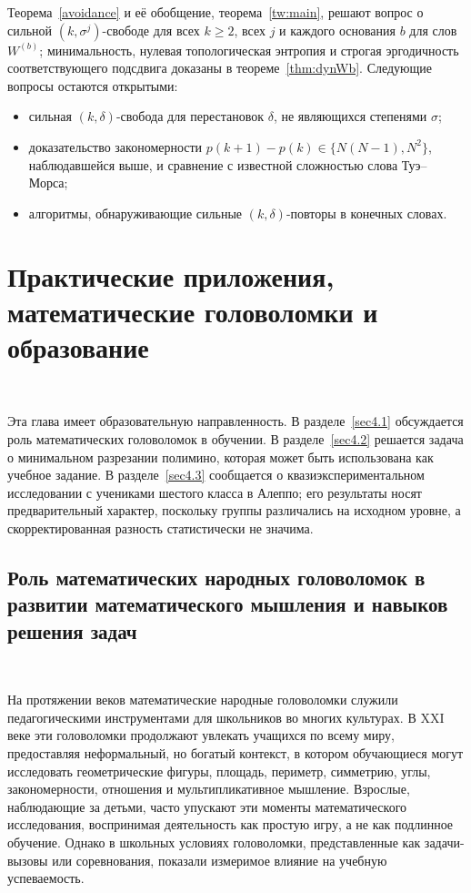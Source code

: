 \documentclass[a4paper,14pt]{extreport}
\theoremstyle{plain}
\theoremstyle{definition}
\theoremstyle{remark}
\begin{document}
Теорема~\ref{avoidance} и её обобщение, теорема~\ref{tw:main}, решают вопрос о сильной $(k,\sigma^j)$-свободе для всех $k\ge2$, всех $j$ и каждого основания $b$ для слов $W^{(b)}$; минимальность, нулевая топологическая энтропия и строгая эргодичность соответствующего подсдвига доказаны в теореме~\ref{thm:dynWb}. Следующие вопросы остаются открытыми:
\begin{itemize}
	\item сильная $(k,\delta)$-свобода для перестановок $\delta$, не являющихся степенями $\sigma$;
	\item доказательство закономерности $p(k+1)-p(k)\in\{N(N-1),N^2\}$, наблюдавшейся выше, и сравнение с известной сложностью слова Туэ--Морса;
	\item алгоритмы, обнаруживающие сильные $(k,\delta)$-повторы в конечных словах.
\end{itemize}
\chapter{Практические приложения, математические головоломки и образование}~\label{sec4}

Эта глава имеет образовательную направленность. В разделе~\ref{sec4.1} обсуждается роль математических головоломок в обучении. В разделе~\ref{sec4.2} решается задача о минимальном разрезании полимино, которая может быть использована как учебное задание. В разделе~\ref{sec4.3} сообщается о квазиэкспериментальном исследовании с учениками шестого класса в Алеппо; его результаты носят предварительный характер, поскольку группы различались на исходном уровне, а скорректированная разность статистически не значима.
\section{Роль математических народных головоломок в развитии математического мышления и навыков решения задач}~\label{sec4.1}

На протяжении веков математические народные головоломки служили педагогическими инструментами для школьников во многих культурах. В XXI веке эти головоломки продолжают увлекать учащихся по всему миру, предоставляя неформальный, но богатый контекст, в котором обучающиеся могут исследовать геометрические фигуры, площадь, периметр, симметрию, углы, закономерности, отношения и мультипликативное мышление. Взрослые, наблюдающие за детьми, часто упускают эти моменты математического исследования, воспринимая деятельность как простую игру, а не как подлинное обучение. Однако в школьных условиях головоломки, представленные как задачи-вызовы или соревнования, показали измеримое влияние на учебную успеваемость.
\end{document}
